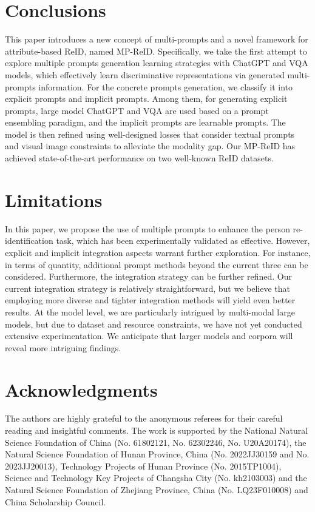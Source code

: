 \documentclass[letterpaper]{article} %
\begin{document}
\section{Conclusions}
This paper introduces a new concept of multi-prompts and a novel framework for attribute-based ReID, named MP-ReID. Specifically, we take the first attempt to explore multiple prompts generation learning strategies with ChatGPT and VQA models, which effectively learn discriminative representations via generated multi-prompts information. For the concrete prompts generation, we classify it into explicit prompts and implicit prompts. Among them, for generating explicit prompts, large model ChatGPT and VQA are used based on a prompt ensembling paradigm, and the implicit prompts are learnable prompts. The model is then refined using well-designed losses that consider textual prompts and visual image constraints to alleviate the modality gap. Our MP-ReID has achieved state-of-the-art performance on two well-known ReID datasets. 

\section*{Limitations}
In this paper, we propose the use of multiple prompts to enhance the person re-identification task, which has been experimentally validated as effective. However, explicit and implicit integration aspects warrant further exploration. For instance, in terms of quantity, additional prompt methods beyond the current three can be considered. Furthermore, the integration strategy can be further refined. Our current integration strategy is relatively straightforward, but we believe that employing more diverse and tighter integration methods will yield even better results. At the model level, we are particularly intrigued by multi-modal large models, but due to dataset and resource constraints, we have not yet conducted extensive experimentation. We anticipate that larger models and corpora will reveal more intriguing findings.

\section{Acknowledgments}
The authors are highly grateful to the anonymous referees for their careful reading and insightful comments. The work is supported by the National Natural Science Foundation of China (No. 61802121, No. 62302246, No. U20A20174), the Natural Science Foundation of Hunan Province, China (No. 2022JJ30159 and No. 2023JJ20013), Technology Projects of Hunan Province (No. 2015TP1004), Science and Technology Key Projects of Changsha City (No. kh2103003) and the Natural Science Foundation of Zhejiang Province, China (No. LQ23F010008) and China Scholarship Council.

\bigskip


\end{document}
